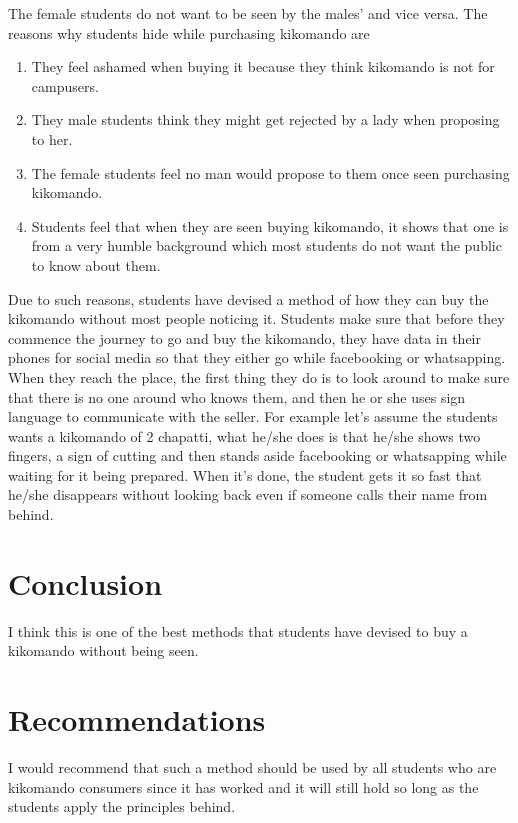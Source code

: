 \documentclass[12pt,a4paper]{article}
\begin{document}
	The female students do not want to be seen by the males’ and vice versa.
	The reasons why students hide while purchasing kikomando are
	\begin{enumerate}	
	\item
		They feel ashamed when buying it because they think kikomando is not for campusers.
		
	
		
	\item
	
		They male students think they might get rejected by a lady when proposing to her.
	

		
	\item
	

		The female students feel no man would propose to them once seen purchasing kikomando.
		
	
		
	\item
	
		Students feel that when they are seen buying kikomando, it shows that one is from a very humble background which most students do not want the public to know about them. 
	\end{enumerate}	

	
	Due to such reasons, students have devised a method of how they can buy the kikomando without most people noticing it.  
	Students make sure that before they commence the journey to go and buy the kikomando, they have data in their phones for social media so that they either go while facebooking or whatsapping.
	When they reach the place, the first thing they do is to look around to make sure that there is no one around who knows them, and then he or she uses sign language to communicate with the seller. For example let’s assume the students wants a kikomando of 2 chapatti, what he/she does is that he/she shows two fingers, a sign of cutting and then stands aside facebooking or whatsapping while waiting for it being prepared. When it’s done, the student gets it so fast that he/she disappears without looking back even if someone calls their name from behind.

	\section{Conclusion}
	I think this is one of the best methods that students have devised to buy a kikomando without being seen.
	
	\section{Recommendations}
	
	I would recommend that such a method should be used by all students who are kikomando consumers since it has worked and it will still hold so long as the students apply the principles behind.
\end{document}
